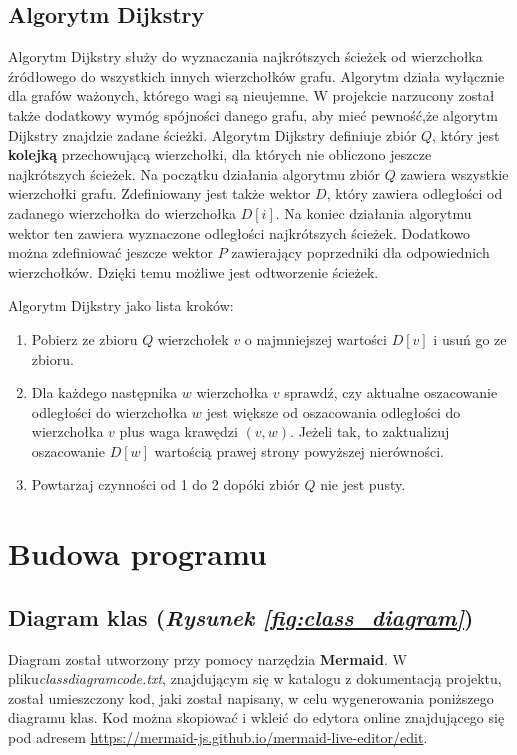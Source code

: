\documentclass{article}
\begin{document}
\newpage

\subsection{Algorytm Dijkstry}
Algorytm Dijkstry służy do wyznaczania najkrótszych ścieżek od wierzchołka źródłowego do wszystkich innych wierzchołków grafu. Algorytm działa wyłącznie dla grafów ważonych, którego wagi są nieujemne. W projekcie narzucony został także dodatkowy wymóg spójności danego grafu, aby mieć pewność,\linebreak że algorytm Dijkstry znajdzie zadane ścieżki. Algorytm Dijkstry definiuje zbiór $Q$, który jest \textbf{kolejką} przechowującą wierzchołki, dla których nie obliczono jeszcze najkrótszych ścieżek. Na początku działania algorytmu zbiór $Q$ zawiera wszystkie wierzchołki grafu. Zdefiniowany jest także wektor $D$, który zawiera odległości od zadanego wierzchołka do wierzchołka $D[i]$. Na koniec działania algorytmu wektor ten zawiera wyznaczone odległości najkrótszych ścieżek. Dodatkowo można zdefiniować jeszcze wektor $P$ zawierający poprzedniki \linebreak dla odpowiednich wierzchołków. Dzięki temu możliwe jest odtworzenie ścieżek.

\medskip

\noindent Algorytm Dijkstry jako lista kroków:
\begin{enumerate}
    \item Pobierz ze zbioru $Q$ wierzchołek $v$ o najmniejszej wartości $D[v]$ i usuń go ze zbioru.
    \item Dla każdego następnika $w$ wierzchołka $v$ sprawdź, czy aktualne oszacowanie odległości do wierzchołka $w$ jest większe od oszacowania odległości \linebreak do wierzchołka $v$ plus waga krawędzi $(v, w)$.
    Jeżeli tak, to zaktualizuj oszacowanie $D[w]$ wartością prawej strony powyższej nierówności.
    \item Powtarzaj czynności od 1 do 2 dopóki zbiór $Q$ nie jest pusty.
\end{enumerate}

\newpage

\section{Budowa programu}
\subsection{Diagram klas (\emph{Rysunek \ref{fig:class_diagram}})}
Diagram został utworzony przy pomocy narzędzia \textbf{Mermaid}. W pliku\linebreak \emph{class\textunderscore diagram\textunderscore code.txt}, znajdującym się w katalogu z dokumentacją projektu, został umieszczony kod, jaki został napisany, w celu wygenerowania poniższego diagramu klas. Kod można skopiować i wkleić do edytora online znajdującego się pod adresem \url{https://mermaid-js.github.io/mermaid-live-editor/edit}.
\end{document}
